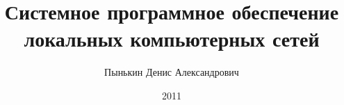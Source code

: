 \documentclass[12pt,a4paper,oneside]{book}
\begin{document}
\title{Системное программное обеспечение локальных компьютерных сетей}
\author{Пынькин Денис Александрович}
\date{2011}
\maketitle

\renewcommand{\contentsname}{Оглавление}

\tableofcontents
\setcounter{tocdepth}{2}
\newpage


%
%

%
%


\end{document}
